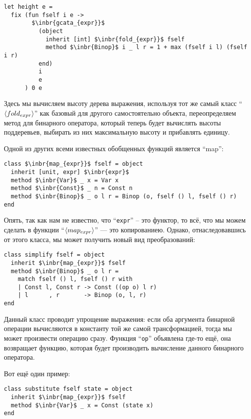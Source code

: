 \begin{lstlisting}
let height e =
  fix (fun fself i e ->
        $\inbr{gcata_{expr}}$ 
          (object 
            inherit [int] $\inbr{fold_{expr}}$ fself
            method $\inbr{Binop}$ i _ l r = 1 + max (fself i l) (fself i r) 
          end) 
          i 
          e
      ) 0 e
\end{lstlisting}

Здесь мы вычисляем высоту дерева выражения, используя тот же самый класс ``$\left<fold_{expr}\right>$'' как базовый для другого самостоятельно объекта, переопределяем метод для бинарного оператора, который теперь будет вычислять высоты поддеревьев, выбирать из них максимальную высоту и прибавлять единицу.

Одной из других всеми известных обобщенных функций является ``map'':

\begin{lstlisting}
class $\inbr{map_{expr}}$ fself = object 
  inherit [unit, expr] $\inbr{expr}$
  method $\inbr{Var}$ _ x = Var x
  method $\inbr{Const}$ _ n = Const n
  method $\inbr{Binop}$ _ o l r = Binop (o, fself () l, fself () r)
end
\end{lstlisting}

Опять, так как нам не известно, что ``\lstinline{expr}'' -- это функтор, то всё, что мы можем сделать в функции ``$\left<map_{expr}\right>$'' --- 
это копированиею. Однако, отнаследовавшись от этого класса, мы может получить новый вид преобразований:

\begin{lstlisting}
class simplify fself = object 
  inherit $\inbr{map_{expr}}$ fself
  method $\inbr{Binop}$ _ o l r =
    match fself () l, fself () r with
    | Const l, Const r -> Const ((op o) l r)
    | l      , r       -> Binop (o, l, r)     
end
\end{lstlisting}

Данный класс проводит упрощение выражения: если оба аргумента бинарной операции вычисляются в константу той же самой трансформацией, тогда 
мы может произвести операцию сразу. Функция ``\lstinline{op}'' объявлена где-то ещё, она возвращает функцию, которая будет производить вычисление данного бинарного оператора.

Вот ещё один пример:

\begin{lstlisting}
class substitute fself state = object 
  inherit $\inbr{map_{expr}}$ fself
  method $\inbr{Var}$ _ x = Const (state x)  
end
\end{lstlisting}

